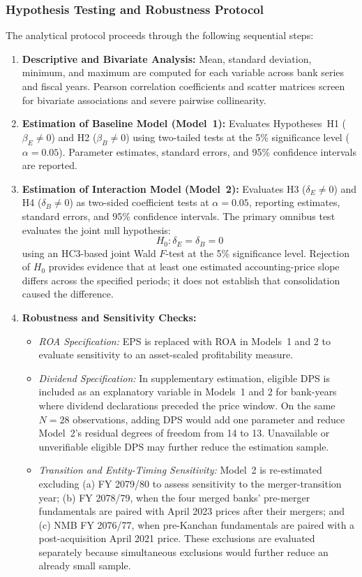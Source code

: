 \subsubsection{Hypothesis Testing and Robustness Protocol}
The analytical protocol proceeds through the following sequential steps:
\begin{enumerate}
  \item \textbf{Descriptive and Bivariate Analysis:} Mean, standard deviation, minimum, and maximum are computed for each variable across bank series and fiscal years. Pearson correlation coefficients and scatter matrices screen for bivariate associations and severe pairwise collinearity.
  \item \textbf{Estimation of Baseline Model (Model~1):} Evaluates Hypotheses~H1 ($\beta_E \ne 0$) and H2 ($\beta_B \ne 0$) using two-tailed tests at the 5\% significance level ($\alpha = 0.05$). Parameter estimates, standard errors, and 95\% confidence intervals are reported.
  \item \textbf{Estimation of Interaction Model (Model~2):} Evaluates H3 ($\delta_E \ne 0$) and H4 ($\delta_B \ne 0$) as two-sided coefficient tests at $\alpha = 0.05$, reporting estimates, standard errors, and 95\% confidence intervals. The primary omnibus test evaluates the joint null hypothesis:
  \begin{equation}
  H_0: \delta_E = \delta_B = 0
  \end{equation}
  using an HC3-based joint Wald $F$-test at the 5\% significance level. Rejection of $H_0$ provides evidence that at least one estimated accounting-price slope differs across the specified periods; it does not establish that consolidation caused the difference.
  \item \textbf{Robustness and Sensitivity Checks:}
  \begin{itemize}
    \item \textit{ROA Specification:} EPS is replaced with ROA in Models~1 and 2 to evaluate sensitivity to an asset-scaled profitability measure.
    \item \textit{Dividend Specification:} In supplementary estimation, eligible DPS is included as an explanatory variable in Models~1 and 2 for bank-years where dividend declarations preceded the price window. On the same $N = 28$ observations, adding DPS would add one parameter and reduce Model~2's residual degrees of freedom from 14 to 13. Unavailable or unverifiable eligible DPS may further reduce the estimation sample.
    \item \textit{Transition and Entity-Timing Sensitivity:} Model~2 is re-estimated excluding (a) FY 2079/80 to assess sensitivity to the merger-transition year; (b) FY 2078/79, when the four merged banks' pre-merger fundamentals are paired with April 2023 prices after their mergers; and (c) NMB FY 2076/77, when pre-Kanchan fundamentals are paired with a post-acquisition April 2021 price. These exclusions are evaluated separately because simultaneous exclusions would further reduce an already small sample.

\end{itemize}
\end{enumerate}
